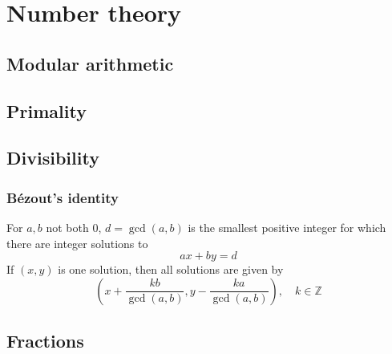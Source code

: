 \chapter{Number theory}

\section{Modular arithmetic}

\section{Primality}

\section{Divisibility}
	
	\subsection{Bézout's identity}
	For $a, b$ not both $0$, $d=\gcd(a,b)$ is the smallest positive integer for which there are integer solutions to
	$$ax+by=d$$
	If $(x,y)$ is one solution, then all solutions are given by
	$$\left(x+\frac{kb}{\gcd(a,b)}, y-\frac{ka}{\gcd(a,b)}\right), \quad k\in\mathbb{Z}$$


\section{Fractions}

